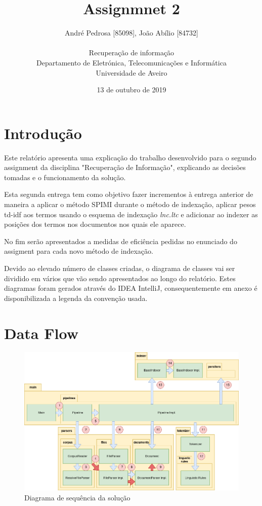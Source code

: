 \documentclass[12pt]{article}
\title{Assignmnet 2}
\author{
    André Pedrosa [85098], João Abílio [84732]\\
    \\
    Recuperação de informação\\
    \normalsize{Departamento de Eletrónica, Telecomunicações e Informática}\\
    \normalsize{Universidade de Aveiro}\\
}
\date{13 de outubro de 2019}
\begin{document}
\baselineskip18pt

\maketitle

\section{Introdução}
Este relatório apresenta uma explicação do trabalho desenvolvido
para o segundo assignment da disciplina "Recuperação de Informação",
explicando as decisões tomadas e o funcionamento da solução.

Esta segunda entrega tem como objetivo fazer incrementos à entrega anterior
de maneira a aplicar o método SPIMI durante o método de indexação, aplicar
pesos td-idf aos termos usando o esquema de indexação {\it lnc.ltc} e adicionar
ao indexer as posições dos termos nos documentos nos quais ele aparece.

No fim serão apresentados a medidas de eficiência pedidas no enunciado do
assigment para cada novo método de indexação.

Devido ao elevado número de classes criadas, o diagrama de classes vai ser
dividido em vários que vão sendo apresentados ao longo do relatório. Estes
diagramas foram gerados através do IDEA IntelliJ, consequentemente em anexo
é disponibilizada a legenda da convenção usada.

\section{Data Flow}
\begin{figure}[h]
  \center
  \includegraphics[width=\linewidth]{newsequenceDiagram.png}
  \caption{Diagrama de sequência da solução}
  \label{fig:dataflow}
\end{figure}
\end{document}
